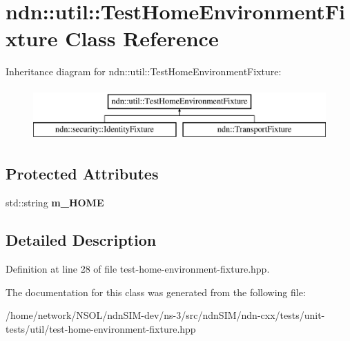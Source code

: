 \hypertarget{classndn_1_1util_1_1TestHomeEnvironmentFixture}{}\section{ndn\+:\+:util\+:\+:Test\+Home\+Environment\+Fixture Class Reference}
\label{classndn_1_1util_1_1TestHomeEnvironmentFixture}
Inheritance diagram for ndn\+:\+:util\+:\+:Test\+Home\+Environment\+Fixture\+:\begin{figure}[H]
\begin{center}
\leavevmode
\includegraphics[height=2.000000cm]{classndn_1_1util_1_1TestHomeEnvironmentFixture}
\end{center}
\end{figure}
\subsection*{Protected Attributes}
\begin{DoxyCompactItemize}
\item 
std\+::string {\bfseries m\+\_\+\+H\+O\+ME}\hypertarget{classndn_1_1util_1_1TestHomeEnvironmentFixture_af0458ca47adda856a74000f134f6f6b1}{}\label{classndn_1_1util_1_1TestHomeEnvironmentFixture_af0458ca47adda856a74000f134f6f6b1}

\end{DoxyCompactItemize}


\subsection{Detailed Description}


Definition at line 28 of file test-\/home-\/environment-\/fixture.\+hpp.



The documentation for this class was generated from the following file\+:\begin{DoxyCompactItemize}
\item 
/home/network/\+N\+S\+O\+L/ndn\+S\+I\+M-\/dev/ns-\/3/src/ndn\+S\+I\+M/ndn-\/cxx/tests/unit-\/tests/util/test-\/home-\/environment-\/fixture.\+hpp\end{DoxyCompactItemize}

